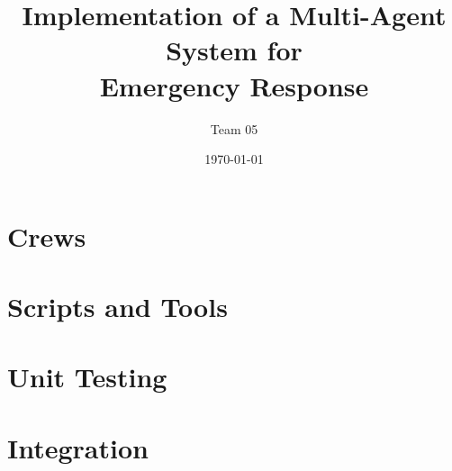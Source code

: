 \documentclass{beamer}
\title{Implementation of a Multi-Agent System for \\Emergency Response}
\author{Team 05}
\date{\today}
\begin{document}




\section{Crews}







\section{Scripts and Tools}






\section{Unit Testing}




\section{Integration}



\section{}


\end{document}
